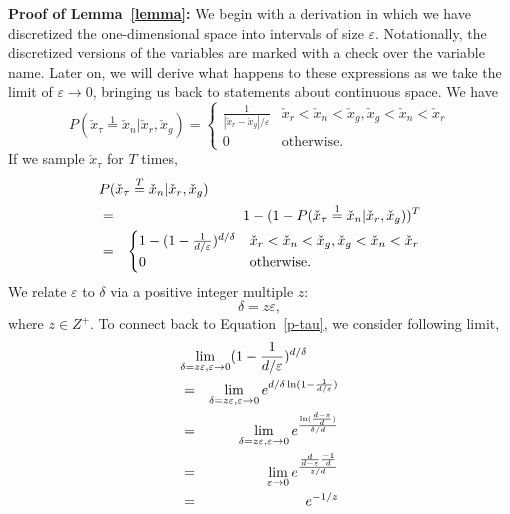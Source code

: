 \documentclass[letterpaper]{article} %
\begin{document}
\noindent \textbf{Proof of Lemma~\ref{lemma}:} We begin with a derivation in which we have discretized the one-dimensional space into intervals of size $\varepsilon$. Notationally, the discretized versions of the variables are marked with a check over the variable name. Later on, we will derive what happens to these expressions as we take the limit of $\varepsilon\rightarrow 0$, bringing us back to statements about continuous space. We have
\begin{equation}\label{p-epsilon-pr-pg}
    P(\check{x}_\tau\overset{1}{=}\check{x}_n|\check{x}_r,\check{x}_g)=
    \begin{cases}
        \frac{1}{|\check{x}_r-\check{x}_g|/\varepsilon} &\mbox{$\check{x}_r<\check{x}_n<\check{x}_g,\check{x}_g<\check{x}_n<\check{x}_r$}\\
        0 &\mbox{otherwise}.
    \end{cases}
\end{equation}
If we sample $\check{x}_\tau$ for $T$ times,
\begin{eqnarray}\label{p-tau}
\lefteqn{ P(\check{x}_\tau\overset{T}{=}\check{x}_n|\check{x}_r,\check{x}_g)}\\
    &=& 1 - (1-P(\check{x}_\tau\overset{1}{=}\check{x}_n|\check{x}_r,\check{x}_g))^T \nonumber\\
    &=&
    \begin{cases}
        1 - (1-\frac{1}{d/\varepsilon})^{d/\delta} &\mbox{$\check{x}_r<\check{x}_n<\check{x}_g,\check{x}_g<\check{x}_n<\check{x}_r$} \\
        0 &\mbox{otherwise}. \nonumber
    \end{cases}
\end{eqnarray}
We relate $\varepsilon$ to $\delta$ via a positive integer multiple $z$:
\begin{equation}\label{deltal-satisfy}
  \delta = z \varepsilon,
\end{equation}
where $z \in Z^{+}$.
To connect back to Equation~\eqref{p-tau}, we consider following limit,
\begin{eqnarray}\label{limit-constant}
\lefteqn{\lim_{\delta=z\varepsilon,\varepsilon\rightarrow 0} (1-\frac{1}{d/\varepsilon})^{d/\delta}} \nonumber\\
    \nonumber &=& \lim_{\delta=z\varepsilon,\varepsilon\rightarrow 0} e^{d/\delta \ln(1-\frac{1}{d/\varepsilon})} \\
    \nonumber &=& \lim_{\delta=z\varepsilon,\varepsilon\rightarrow 0} e^{\frac{\ln(\frac{d-\varepsilon}{d})}{\delta/d}} \\
    \nonumber &=& \lim_{\varepsilon\rightarrow0} e^{\frac{\frac{d}{d-\varepsilon}\frac{-1}{d}}{z/d}} \\
    &=& e^{-1/z} \label{e:e}
\end{eqnarray}
\end{document}
